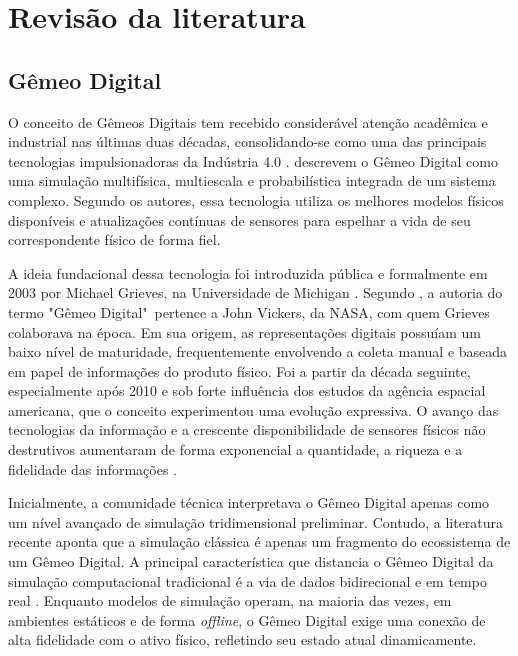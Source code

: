 \chapter{Revisão da literatura}
\label{chap:revisao}

\section{Gêmeo Digital}
\label{sec:digitaltwin}

O conceito de Gêmeos Digitais tem recebido considerável atenção acadêmica e industrial nas últimas duas décadas, consolidando-se como uma das principais tecnologias impulsionadoras da Indústria 4.0 \cite{dtchallenges, lu2020digitaltwin}.  descrevem o Gêmeo Digital como uma simulação multifísica, multiescala e probabilística integrada de um sistema complexo. Segundo os autores, essa tecnologia utiliza os melhores modelos físicos disponíveis e atualizações contínuas de sensores para espelhar a vida de seu correspondente físico de forma fiel.

A ideia fundacional dessa tecnologia foi introduzida pública e formalmente em 2003 por Michael Grieves, na Universidade de Michigan \cite{grieves2014, tao2019}. Segundo , a autoria do termo "Gêmeo Digital"\ pertence a John Vickers, da NASA, com quem Grieves colaborava na época. Em sua origem, as representações digitais possuíam um baixo nível de maturidade, frequentemente envolvendo a coleta manual e baseada em papel de informações do produto físico. Foi a partir da década seguinte, especialmente após 2010 e sob forte influência dos estudos da agência espacial americana, que o conceito experimentou uma evolução expressiva. O avanço das tecnologias da informação e a crescente disponibilidade de sensores físicos não destrutivos aumentaram de forma exponencial a quantidade, a riqueza e a fidelidade das informações \cite{grieves2014, tao2019}.

Inicialmente, a comunidade técnica interpretava o Gêmeo Digital apenas como um nível avançado de simulação tridimensional preliminar. Contudo, a literatura recente aponta que a simulação clássica é apenas um fragmento do ecossistema de um Gêmeo Digital. A principal característica que distancia o Gêmeo Digital da simulação computacional tradicional é a via de dados bidirecional e em tempo real \cite{sapandanylogic}. Enquanto modelos de simulação operam, na maioria das vezes, em ambientes estáticos e de forma \textit{offline}, o Gêmeo Digital exige uma conexão de alta fidelidade com o ativo físico, refletindo seu estado atual dinamicamente. 

